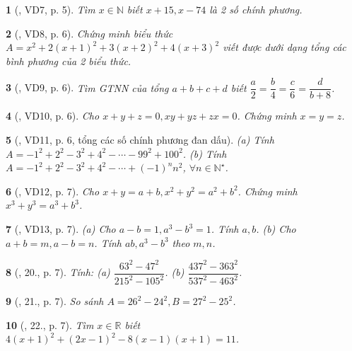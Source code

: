 \documentclass{article}
\newtheorem{baitoan}{}
\begin{document}
\begin{baitoan}[\cite{Binh_Toan_8_tap_1}, VD7, p. 5]
	Tìm $x\in\mathbb{N}$ biết $x + 15,x - 74$ là 2 số chính phương.
\end{baitoan}

\begin{baitoan}[\cite{Binh_Toan_8_tap_1}, VD8, p. 6]
	Chứng minh biểu thức $A = x^2 + 2(x + 1)^2 + 3(x + 2)^2 + 4(x + 3)^2$ viết được dưới dạng tổng các bình phương của 2 biểu thức.
\end{baitoan}

\begin{baitoan}[\cite{Binh_Toan_8_tap_1}, VD9, p. 6]
	Tìm {\rm GTNN} của tổng $a + b + c + d$ biết $\dfrac{a}{2} = \dfrac{b}{4} = \dfrac{c}{6} = \dfrac{d}{b + 8}$.
\end{baitoan}

\begin{baitoan}[\cite{Binh_Toan_8_tap_1}, VD10, p. 6]
	Cho $x + y + z = 0,xy + yz + zx = 0$. Chứng minh $x = y = z$.
\end{baitoan}

\begin{baitoan}[\cite{Binh_Toan_8_tap_1}, VD11, p. 6, tổng các số chính phương đan dấu]
	(a) Tính $A = -1^2 + 2^2 - 3^2 + 4^2 - \cdots - 99^2 + 100^2$. (b) Tính $A = -1^2 + 2^2 - 3^2 + 4^2 - \cdots + (-1)^nn^2$, $\forall n\in\mathbb{N}^\star$.
\end{baitoan}

\begin{baitoan}[\cite{Binh_Toan_8_tap_1}, VD12, p. 7]
	Cho $x + y = a + b,x^2 + y^2 = a^2 + b^2$. Chứng minh $x^3 + y^3 = a^3 + b^3$.
\end{baitoan}

\begin{baitoan}[\cite{Binh_Toan_8_tap_1}, VD13, p. 7]
	(a) Cho $a - b = 1,a^3 - b^3 = 1$. Tính $a,b$. (b) Cho $a + b = m,a - b = n$. Tính $ab,a^3 - b^3$ theo $m,n$.
\end{baitoan}

\begin{baitoan}[\cite{Binh_Toan_8_tap_1}, 20., p. 7]
	Tính: (a) $\dfrac{63^2 - 47^2}{215^2 - 105^2}$. (b) $\dfrac{437^2 - 363^2}{537^2 - 463^2}$.
\end{baitoan}

\begin{baitoan}[\cite{Binh_Toan_8_tap_1}, 21., p. 7]
	So sánh $A = 26^2 - 24^2,B = 27^2 - 25^2$.
\end{baitoan}

\begin{baitoan}[\cite{Binh_Toan_8_tap_1}, 22., p. 7]
	Tìm $x\in\mathbb{R}$ biết $4(x + 1)^2 + (2x - 1)^2 - 8(x - 1)(x + 1) = 11$.
\end{baitoan}
\end{document}
